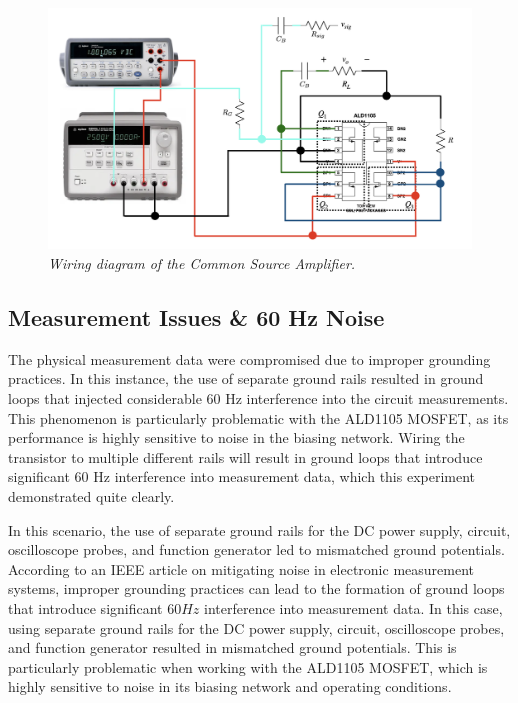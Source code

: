 \begin{center}
\begin{figure}[ht]
\includegraphics[scale=0.45]{Chapter_3/Lab_03_Image_2.png}
\caption{\emph{Wiring diagram of the Common Source Amplifier.}}
\label{Ch3_fig:2}
\end{figure}
\end{center}

\newpage

\vspace{.25cm}

\subsection{Measurement Issues \& 60 Hz Noise}

The physical measurement data were compromised due to improper grounding practices. In this instance, the use of separate ground rails resulted in ground loops that injected considerable $60$ Hz interference into the circuit measurements. This phenomenon is particularly problematic with the ALD1105 MOSFET, as its performance is highly sensitive to noise in the biasing network. Wiring the transistor to multiple different rails will result in ground loops that introduce significant $60$ Hz interference into measurement data, which this experiment demonstrated quite clearly. \cite{yao2015ecce}

In this scenario, the use of separate ground rails for the DC power supply, circuit, oscilloscope probes, and function generator led to mismatched ground potentials. According to an IEEE article on mitigating noise in electronic measurement systems, improper grounding practices can lead to the formation of ground loops that introduce significant $60 Hz$ interference into measurement data. In this case, using separate ground rails for the DC power supply, circuit, oscilloscope probes, and function generator resulted in mismatched ground potentials. This is particularly problematic when working with the ALD1105 MOSFET, which is highly sensitive to noise in its biasing network and operating conditions. \cite{cavache2023siitme}

